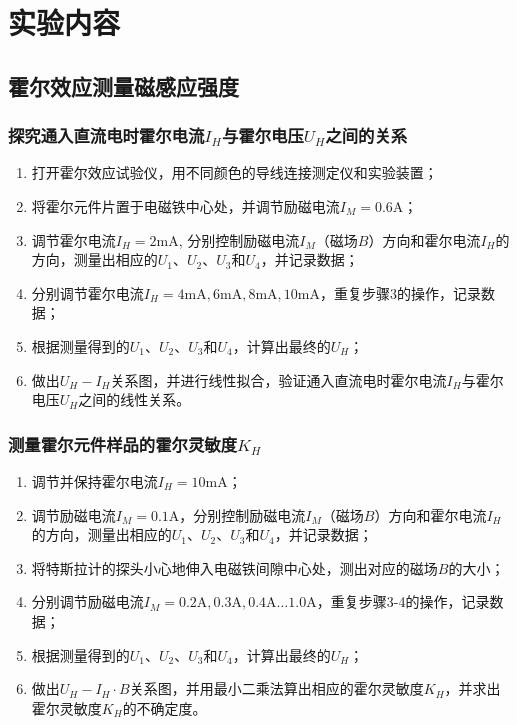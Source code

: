 \documentclass[zihao=5, UTF8]{article}
\theoremstyle{MyLineTheoremStyle} %
\theoremstyle{MyBlockTheoremStyle} %
\theoremstyle{MySubsubsectionStyle} %
\begin{document}
\section{实验内容}

\subsection{霍尔效应测量磁感应强度}

\subsubsection{探究通入直流电时霍尔电流$I_H$与霍尔电压$U_H$之间的关系}
\begin{enumerate}
    \item 打开霍尔效应试验仪，用不同颜色的导线连接测定仪和实验装置；
    \item 将霍尔元件片置于电磁铁中心处，并调节励磁电流$I_M=0.6\text{A}$；
    \item 调节霍尔电流$I_H=2\text{mA}$, 分别控制励磁电流$I_M$（磁场$B$）方向和霍尔电流$I_H$的方向，测量出相应的$U_1$、$U_2$、$U_3$和$U_4$，并记录数据；
    \item 分别调节霍尔电流$I_H=4\text{mA},6\text{mA},8\text{mA},10\text{mA}$，重复步骤3的操作，记录数据；
    \item 根据测量得到的$U_1$、$U_2$、$U_3$和$U_4$，计算出最终的$U_H$；
    \item 做出$U_H-I_H$关系图，并进行线性拟合，验证通入直流电时霍尔电流$I_H$与霍尔电压$U_H$之间的线性关系。
\end{enumerate}

\subsubsection{测量霍尔元件样品的霍尔灵敏度$K_H$}
\begin{enumerate}
    \item 调节并保持霍尔电流$I_H=10\text{mA}$；
    \item 调节励磁电流$I_M=0.1\text{A}$，分别控制励磁电流$I_M$（磁场$B$）方向和霍尔电流$I_H$的方向，测量出相应的$U_1$、$U_2$、$U_3$和$U_4$，并记录数据；
    \item 将特斯拉计的探头小心地伸入电磁铁间隙中心处，测出对应的磁场$B$的大小；
    \item 分别调节励磁电流$I_M=0.2\text{A},0.3\text{A},0.4\text{A} \ldots 1.0\text{A}$，重复步骤3-4的操作，记录数据；
    \item 根据测量得到的$U_1$、$U_2$、$U_3$和$U_4$，计算出最终的$U_H$；
    \item 做出$U_H-I_H \cdot B$关系图，并用最小二乘法算出相应的霍尔灵敏度$K_H$，并求出霍尔灵敏度$K_H$的不确定度。
\end{enumerate}
\end{document}
